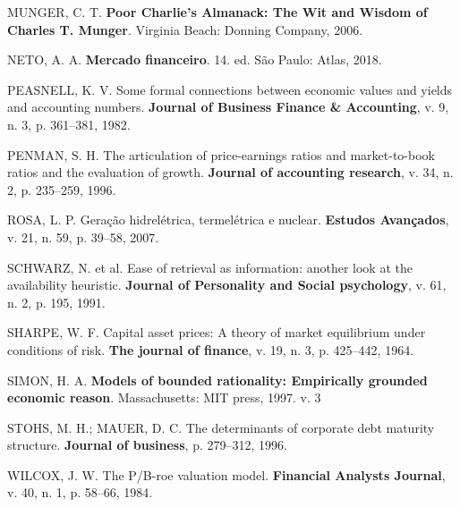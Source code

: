 \documentclass[grad,numbers]{coppe}
\newenvironment{cslreferences}%
  {}%
  {\par}
\begin{document}
\begin{cslreferences}
  \leavevmode\hypertarget{ref-munger2006}{}%
  MUNGER, C. T. \textbf{Poor Charlie's Almanack: The Wit and Wisdom of Charles T. Munger}. Virginia Beach: Donning Company, 2006.

  \leavevmode\hypertarget{ref-assafneto2018}{}%
  NETO, A. A. \textbf{Mercado financeiro}. 14. ed. São Paulo: Atlas, 2018.

  \leavevmode\hypertarget{ref-peasnell1982}{}%
  PEASNELL, K. V. Some formal connections between economic values and yields and accounting numbers. \textbf{Journal of Business Finance \& Accounting}, v. 9, n. 3, p. 361--381, 1982.

  \leavevmode\hypertarget{ref-penman1996}{}%
  PENMAN, S. H. The articulation of price-earnings ratios and market-to-book ratios and the evaluation of growth. \textbf{Journal of accounting research}, v. 34, n. 2, p. 235--259, 1996.

  \leavevmode\hypertarget{ref-rosa2007}{}%
  ROSA, L. P. Geração hidrelétrica, termelétrica e nuclear. \textbf{Estudos Avançados}, v. 21, n. 59, p. 39--58, 2007.

  \leavevmode\hypertarget{ref-schwarz1991}{}%
  SCHWARZ, N. et al. Ease of retrieval as information: another look at the availability heuristic. \textbf{Journal of Personality and Social psychology}, v. 61, n. 2, p. 195, 1991.

  \leavevmode\hypertarget{ref-sharpe1964}{}%
  SHARPE, W. F. Capital asset prices: A theory of market equilibrium under conditions of risk. \textbf{The journal of finance}, v. 19, n. 3, p. 425--442, 1964.

  \leavevmode\hypertarget{ref-simon1997}{}%
  SIMON, H. A. \textbf{Models of bounded rationality: Empirically grounded economic reason}. Massachusetts: MIT press, 1997. v. 3

  \leavevmode\hypertarget{ref-stohs1996}{}%
  STOHS, M. H.; MAUER, D. C. The determinants of corporate debt maturity structure. \textbf{Journal of business}, p. 279--312, 1996.

  \leavevmode\hypertarget{ref-wilcox1984}{}%
  WILCOX, J. W. The P/B-roe valuation model. \textbf{Financial Analysts Journal}, v. 40, n. 1, p. 58--66, 1984.
  \end{cslreferences}
  \backmatter
  
  

\end{document}
